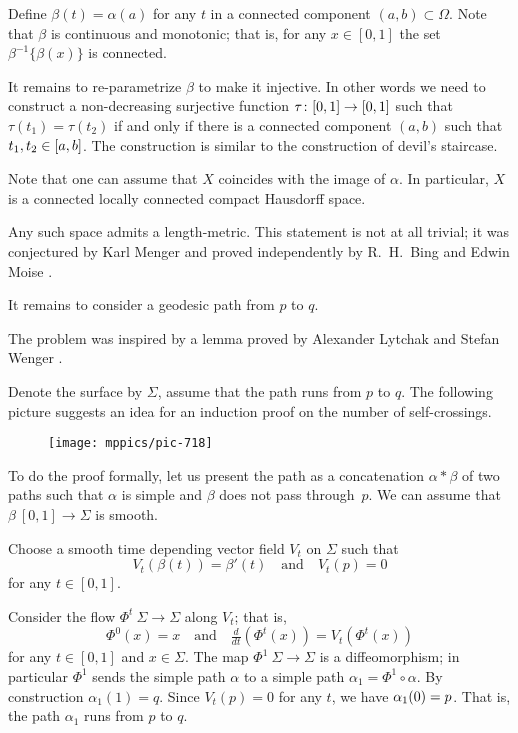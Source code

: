Define $\beta(t)=\alpha(a)$ for any $t$ in a connected component $(a,b)\subset\Omega$.
Note that $\beta$ is continuous and monotonic;
that is, for any $x\in [0,1]$ the set $\beta^{-1}\{\beta(x)\}$ is connected.

It remains to re-parametrize $\beta$ to make it injective.
In other words we need to construct a non-decreasing surjective function $\tau\:[0,1]\z\to[0,1]$ such that 
$\tau(t_1)=\tau(t_2)$ if and only if there is a connected component $(a,b)$ such that $t_1,t_2\z\in [a,b]$.
The construction is similar to the construction of devil's staircase.
\qeds

Note that one can assume that $X$ coincides with the image of $\alpha$.
In particular, $X$ is a connected locally connected compact Hausdorff space.

Any such space admits a length-metric.
This statement is not at all trivial;
it was conjectured by Karl Menger \cite{menger}
and proved independently 
by R.~H.~Bing  \cite{bing-length-0, bing-length-1} 
and Edwin Moise \cite{moise}.

It remains to consider a geodesic path from $p$ to $q$.
\qeds

The problem was inspired by a lemma 
proved by 
Alexander Lytchak
and Stefan Wenger \cite[see 7.13 in][]{lytchak-wenger}.


Denote the surface by $\Sigma$, assume that the path runs from $p$ to $q$.
The following picture suggests an idea for an induction proof on the number of self-crossings.

\begin{figure}[h!]
\vskip0mm
\centering
\texttt{[image: mppics/pic-718]}
\end{figure}

To do the proof formally,
let us present the path as a concatenation $\alpha*\beta$ of two paths  such that $\alpha$ is simple
and $\beta$ does not pass through~$p$.
We can assume that $\beta\:[0,1]\to \Sigma$ is smooth.

Choose a smooth time depending vector field $V_t$ on $\Sigma$ such that
\[V_t(\beta(t))=\beta'(t)\quad\text{and}\quad V_t(p)=0\]
for any $t\in[0,1]$. 

Consider the flow $\Phi^t\:\Sigma\to \Sigma$ along $V_t$;
that is,
\[\Phi^0(x)=x\quad\text{and}\quad \tfrac{d}{dt}(\Phi^t(x))=V_t(\Phi^t(x))\]
for any $t\in[0,1]$ and $x\in \Sigma$.
The map $\Phi^1\:\Sigma\to \Sigma$ is a diffeomorphism;
in particular $\Phi^1$ sends the simple path $\alpha$ to a simple path $\alpha_1=\Phi^1\circ\alpha$.
By construction $\alpha_1(1)=q$. 
Since $V_t(p)=0$ for any $t$, we have $\alpha_1(0)\z=p$.
That is, the path $\alpha_1$ runs from $p$ to $q$.


